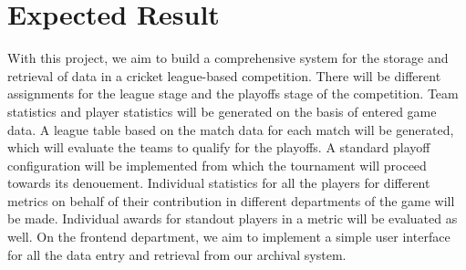 \documentclass[titlepage]{article}
\begin{document}
\section{Expected Result}
With this project, we aim to build a comprehensive system for the storage and retrieval of data in a cricket league-based competition. There will be different assignments for the league stage and the playoffs stage of the competition. Team statistics and player statistics will be generated on the basis of entered game data. A league table based on the match data for each match will be generated, which will evaluate the teams to qualify for the playoffs. A standard playoff configuration will be implemented from which the tournament will proceed towards its denouement. Individual statistics for all the players for different metrics on behalf of their contribution in different departments of the game will be made. Individual awards for standout players in a metric will be evaluated as well. On the frontend department, we aim to implement a simple user interface for all the data entry and retrieval from our archival system. 
\end{document}
